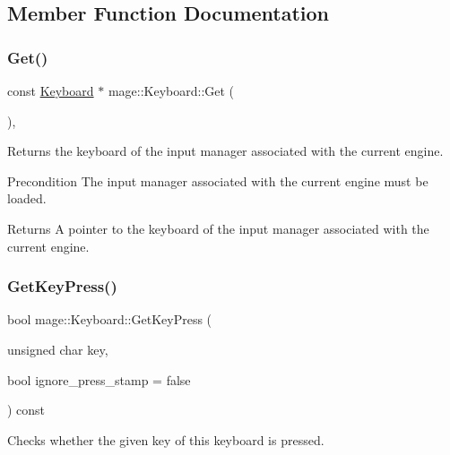 \subsection{Member Function Documentation}
\hypertarget{classmage_1_1_keyboard_a696032d3a0d9bcf1a677a35e1e3d9aa8}{}\label{classmage_1_1_keyboard_a696032d3a0d9bcf1a677a35e1e3d9aa8} 
\subsubsection{\texorpdfstring{Get()}{Get()}}
{\footnotesize\ttfamily const \hyperlink{classmage_1_1_keyboard}{Keyboard} $\ast$ mage\+::\+Keyboard\+::\+Get (\begin{DoxyParamCaption}{ }\end{DoxyParamCaption})\hspace{0.3cm}{\ttfamily [static]}, {\ttfamily [noexcept]}}

Returns the keyboard of the input manager associated with the current engine.

\begin{DoxyPrecond}{Precondition}
The input manager associated with the current engine must be loaded. 
\end{DoxyPrecond}
\begin{DoxyReturn}{Returns}
A pointer to the keyboard of the input manager associated with the current engine. 
\end{DoxyReturn}
\hypertarget{classmage_1_1_keyboard_a6dbb2b58efa2d3f24c63b44d5b008fad}{}\label{classmage_1_1_keyboard_a6dbb2b58efa2d3f24c63b44d5b008fad} 
\subsubsection{\texorpdfstring{Get\+Key\+Press()}{GetKeyPress()}}
{\footnotesize\ttfamily bool mage\+::\+Keyboard\+::\+Get\+Key\+Press (\begin{DoxyParamCaption}\item[{unsigned char}]{key,  }\item[{bool}]{ignore\+\_\+press\+\_\+stamp = {\ttfamily false} }\end{DoxyParamCaption}) const\hspace{0.3cm}{\ttfamily [noexcept]}}

Checks whether the given key of this keyboard is pressed.


